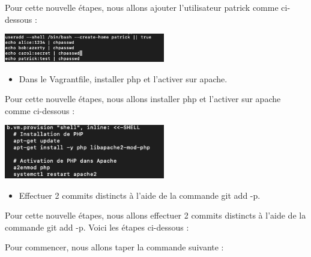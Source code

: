 \documentclass[12pt]{article}
\begin{document}
Pour cette nouvelle étapes, nous allons ajouter l'utilisateur patrick comme ci-dessous : 

\vspace{0.3cm}

\begin{center}
  \includegraphics[width=7cm]{Image-TD-Git-2/ajout-patrick-vagrant.png}
\end{center}

\vspace{0.3cm}

\begin{itemize}
  \item Dans le Vagrantfile, installer php et l'activer sur apache.
\end{itemize}

\vspace{0.3cm}

Pour cette nouvelle étapes, nous allons installer php et l'activer sur apache comme ci-dessous : 

\vspace{0.3cm}

\begin{center}
  \includegraphics[width=7cm]{Image-TD-Git-2/php-apache.png}
\end{center}

\vspace{0.3cm}

\begin{itemize}
  \item Effectuer 2 commits distincts à l'aide de la commande git add -p.
\end{itemize}

\vspace{0.3cm}

Pour cette nouvelle étapes, nous allons effectuer 2 commits distincts à l'aide de la commande git add -p. Voici les étapes ci-dessous : 

\vspace{0.3cm}

Pour commencer, nous allons taper la commande suivante : 
\end{document}
